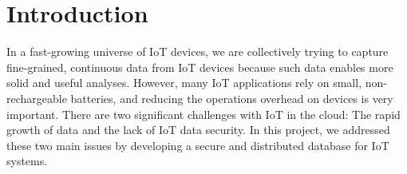 \section{Introduction}
\label{sec:Introduction}
In a fast-growing universe of IoT devices, we are collectively trying to capture fine-grained, continuous data from IoT devices because such data enables more solid and useful analyses. However, many IoT applications rely on small, non-rechargeable batteries, and reducing the operations overhead on devices is very important. There are two significant challenges with IoT in the cloud: The rapid growth of data and the lack of IoT data security. In this project, we addressed these two main issues by developing a secure and distributed database for IoT systems. 

